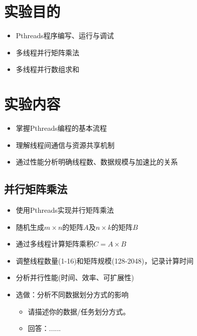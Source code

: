 \documentclass{SYSUReport}
\date{2025年4月9日}
\begin{document}
\cover
\thispagestyle{empty} %
\clearpage



\section{实验目的}
\begin{itemize}
    \item Pthreads程序编写、运行与调试
    \item 多线程并行矩阵乘法
    \item 多线程并行数组求和
\end{itemize}

\section{实验内容}
\begin{itemize}
    \item 掌握Pthreads编程的基本流程
    \item 理解线程间通信与资源共享机制
    \item 通过性能分析明确线程数、数据规模与加速比的关系
\end{itemize}
\subsection{并行矩阵乘法}
\begin{itemize}
    \item 使用Pthreads实现并行矩阵乘法
    \item 随机生成$m \times n$的矩阵$A$及$n \times k$的矩阵$B$
    \item 通过多线程计算矩阵乘积$C = A \times B$
    \item 调整线程数量(1-16)和矩阵规模(128-2048)，记录计算时间
    \item 分析并行性能(时间、效率、可扩展性)
    \item 选做：分析不同数据划分方式的影响
     \begin{itemize}
        \item 请描述你的数据/任务划分方式。
        \item 回答：......
    \end{itemize}
\end{itemize}
\end{document}
